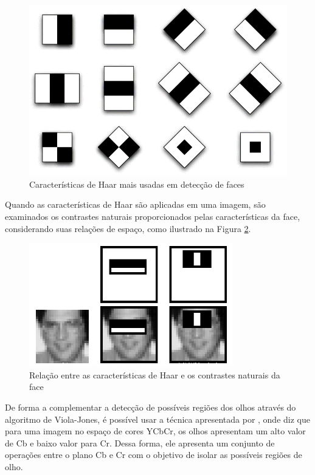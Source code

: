 \begin{anexosenv}
\begin{figure}[htb]
		\centering
			\includegraphics[scale=0.7]{figuras/haar.png}
		\caption{Características de Haar mais usadas em detecção de faces}
		\label{fig09}
\end{figure}

Quando as características de Haar são aplicadas em uma imagem, são examinados os contrastes naturais proporcionados pelas características da face, considerando suas relações de espaço, como ilustrado na Figura \ref{fig10}.


\begin{figure}[htb]
		\centering
			\includegraphics[scale=0.7]{figuras/haar2.png}
		\caption{Relação entre as características de Haar e os contrastes naturais da face}
		\label{fig10}
\end{figure}

De forma a complementar a detecção de possíveis regiões dos olhos através do algoritmo de Viola-Jones, é possível usar a técnica apresentada por , onde diz que para uma imagem no espaço de cores YCbCr, os olhos apresentam um alto valor de Cb e baixo valor para Cr. Dessa forma, ele apresenta um conjunto de operações entre o plano Cb e Cr com o objetivo de isolar as possíveis regiões de olho.


\end{anexosenv}

